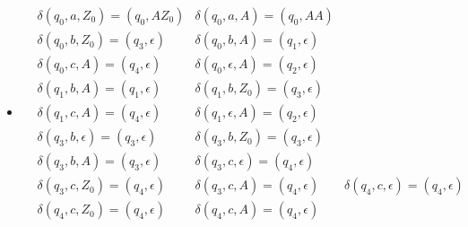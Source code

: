 \documentclass{article}
\begin{document}
\begin{enumerate}
{\begin{enumerate}
{\begin{itemize}
{				\begin{align*}
         			&\delta (q_0, a , Z_0) = \{(q_0, AZ_0)\}
         			&\delta (q_0, a , A) = \{(q_0, AA)\}\\ 
                    &\delta (q_0, b , Z_0) = \{(q_4, \epsilon)\} 
                    &\delta (q_0, b , A) = \{(q_1, \epsilon), (q_2, BA)\} \\
                    &\delta (q_0, c, Z_0) = \{(q_4, \epsilon)\}
					&\delta (q_0, c, A) = \{(q_4, \epsilon)\}\\
					&\delta (q_0, \epsilon , A) = \{(q_4, \epsilon)\}
         			&\delta (q_1, b , A) = \{(q_1, \epsilon)\} \\
         			&\delta (q_1, c , A) = \{(q_4, \epsilon)\}
         			&\delta (q_1, b , Z_0) = \{(q_4, \epsilon)\} \\
         			&\delta (q_2, b , B) = \{(q_2, BB)\}
					&\delta (q_2, c , B) = \{(q_3, \epsilon)\} \\
					&\delta (q_2, \epsilon, A) = \{(q_4, \epsilon)\}
					&\delta (q_2, \epsilon, B) = \{(q_4, \epsilon)\} \\
                    &\delta (q_3, c , B) = \{(q_3, \epsilon)\}
                    &\delta (q_3, c , A) = \{(q_4, \epsilon)\} \\
                    &\delta (q_3, c , Z_0) = \{(q_4, \epsilon)\}
                    &\delta (q_3, \epsilon , A) = \{(q_4, \epsilon)\} \\
         		\end{align*}
			 }
			 
			 \item {
         	        		
				\begin{align*}
					&\delta (q_0, a, Z_0) = (q_0, AZ_0)
					&\delta (q_0, a, A) = (q_0, AA) \\
					&\delta (q_0, b, Z_0) = (q_3, \epsilon)
					&\delta (q_0, b, A) = (q_1, \epsilon) \\
					&\delta (q_0, c, A) = (q_4, \epsilon)
					&\delta (q_0, \epsilon, A) = (q_2, \epsilon) \\
					&\delta (q_1, b, A) = (q_1, \epsilon)
					&\delta (q_1, b, Z_0) = (q_3, \epsilon) \\
					&\delta (q_1, c, A) = (q_4, \epsilon)
					&\delta (q_1, \epsilon, A) = (q_2, \epsilon) \\
					&\delta (q_3, b, \epsilon) = (q_3, \epsilon)
					&\delta (q_3, b, Z_0) = (q_3, \epsilon) \\
					&\delta (q_3, b, A) = (q_3, \epsilon)
					&\delta (q_3, c, \epsilon) = (q_4, \epsilon) \\
					&\delta (q_3, c, Z_0) = (q_4, \epsilon)
					&\delta (q_3, c, A) = (q_4, \epsilon)
					&\delta (q_4, c, \epsilon) = (q_4, \epsilon) \\
					&\delta (q_4, c, Z_0) = (q_4, \epsilon)
					&\delta (q_4, c, A) = (q_4, \epsilon)
         		\end{align*}
			 }
			 

\end{itemize}}
\end{enumerate}}
\end{enumerate}
\end{document}
